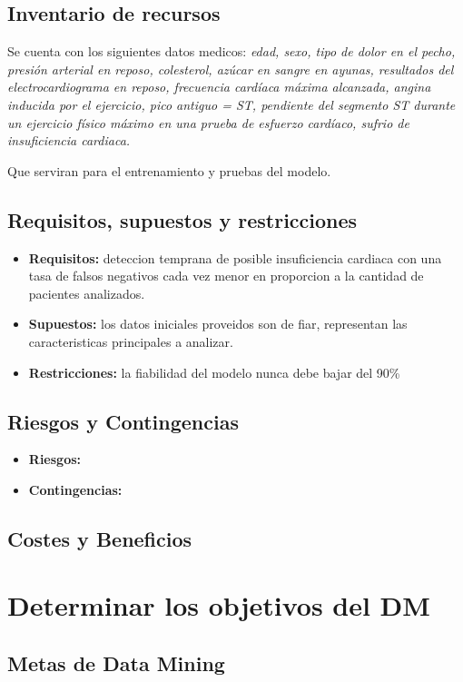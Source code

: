 \documentclass[12pt, letterpaper, spanish]{article}
\begin{document}
\subsection{Inventario de recursos}
Se cuenta con los siguientes datos medicos: \emph{edad, sexo, tipo de dolor en el pecho, 
presión arterial en reposo, colesterol, azúcar en sangre en ayunas, 
resultados del electrocardiograma en reposo, frecuencia cardíaca máxima alcanzada, 
angina inducida por el ejercicio, pico antiguo = ST, 
pendiente del segmento ST durante un ejercicio físico máximo en una prueba de esfuerzo cardíaco, 
sufrio de insuficiencia cardiaca.}

Que serviran para el entrenamiento y pruebas del modelo.
\subsection{Requisitos, supuestos y restricciones}
\begin{itemize}
  \item{\textbf{Requisitos: }deteccion temprana de posible insuficiencia cardiaca
  con una tasa de falsos negativos cada vez menor en proporcion a la
  cantidad de pacientes analizados.} 
  \item{\textbf{Supuestos: }los datos iniciales proveidos son de fiar, representan
  las caracteristicas principales a analizar.}
  \item{\textbf{Restricciones: }la fiabilidad del modelo nunca debe bajar del 90\%}
\end{itemize}
\subsection{Riesgos y Contingencias}
\begin{itemize}
  \item{\textbf{Riesgos: }} 
  \item{\textbf{Contingencias: }}
\end{itemize}
\subsection{Costes y Beneficios}
\section{Determinar los objetivos del DM}
\subsection{Metas de Data Mining}
\end{document}
